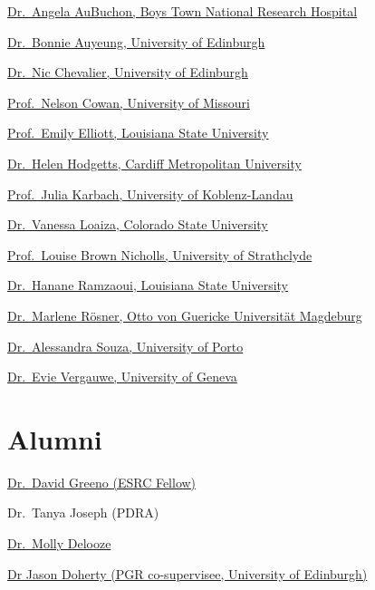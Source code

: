 \documentclass[
  12pt,
]{book}
\begin{document}
\href{https://www.boystownhospital.org/research/Faculty/Pages/Angela-AuBuchon.aspx}{Dr.~Angela AuBuchon, Boys Town National Research Hospital}

\href{https://www.ed.ac.uk/profile/bonnie-auyeung}{Dr.~Bonnie Auyeung, University of Edinburgh}

\href{https://www.ed.ac.uk/profile/nicolas-chevalier}{Dr.~Nic Chevalier, University of Edinburgh}

\href{http://memory.psych.missouri.edu/cowan.shtml}{Prof.~Nelson Cowan, University of Missouri}

\href{https://www.lsu.edu/hss/psychology/faculty/cognitive/elliott.php}{Prof.~Emily Elliott, Louisiana State University}

\href{https://www.cardiffmet.ac.uk/health/staff/Pages/Helen-Hodgetts.aspx}{Dr.~Helen Hodgetts, Cardiff Metropolitan University}

\href{https://psy.rptu.de/en/wus/cognition-and-development-lab/team/prof-julia-karbach}{Prof.~Julia Karbach, University of Koblenz-Landau}

\href{https://psychlabs.colostate.edu/camlab/people/}{Dr.~Vanessa Loaiza, Colorado State University}

\href{https://www.strath.ac.uk/staff/brownlouisedr/}{Prof.~Louise Brown Nicholls, University of Strathclyde}

\href{https://www.researchgate.net/profile/Hanane-Ramzaoui}{Dr.~Hanane Ramzaoui, Louisiana State University}

\href{https://www.linkedin.com/in/marleneroesner/}{Dr.~Marlene Rösner, Otto von Guericke Universität Magdeburg}

\href{https://sigarra.up.pt/fpceup/en/func_geral.formview?p_codigo=654770}{Dr.~Alessandra Souza, University of Porto}

\href{https://www.unige.ch/fapse/womcogdev/home/contact/evie-vergauwe}{Dr.~Evie Vergauwe, University of Geneva}

\section{Alumni}\label{alumni}

\href{https://profiles.cardiff.ac.uk/staff/greenodj}{Dr.~David Greeno (ESRC Fellow)}

Dr.~Tanya Joseph (PDRA)

\href{https://www.linkedin.com/in/molly-a-delooze-68518428a/}{Dr.~Molly Delooze}

\href{https://www.slu.edu/medicine/ahead/about-us/ahead-team/jason-doherty.php}{Dr Jason Doherty (PGR co-supervisee, University of Edinburgh)}
\end{document}
